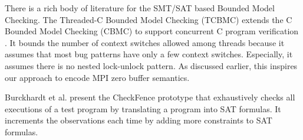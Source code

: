 There is a rich body of literature for the SMT/SAT based Bounded Model Checking. 
The Threaded-C Bounded Model Checking (TCBMC) extends the C Bounded Model Checking (CBMC) \cite{DBLP:conf/tacas/ClarkeKL04, DBLP:conf/dac/ClarkeKY03} to support concurrent C program verification \cite{DBLP:conf/cav/RabinovitzG05}. It bounds the number of context switches allowed among threads because it assumes that most bug patterns have only a few context switches. Especially, it assumes there is no nested lock-unlock pattern. As discussed earlier, this inspires our approach to encode MPI zero buffer semantics.

Burckhardt et al. present the CheckFence prototype \cite{DBLP:conf/pldi/BurckhardtAM07} that exhaustively checks all executions of a test program by translating a program into SAT formulas. It increments the observations each time by adding more constraints to SAT formulas. 
